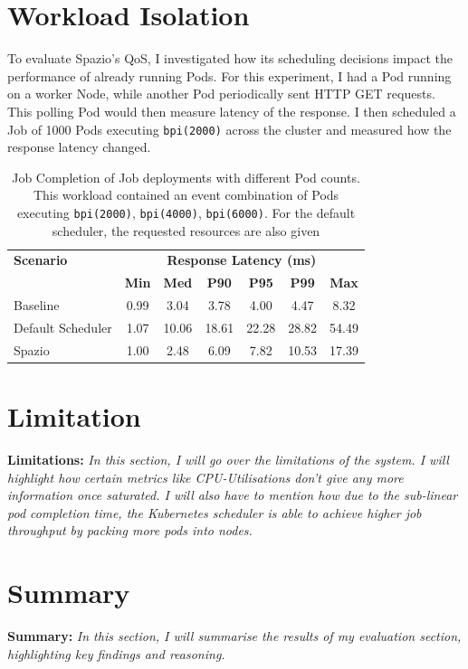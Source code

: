 \section{Workload Isolation}
To evaluate Spazio's QoS, I investigated how its scheduling decisions impact the
performance of already running Pods. For this experiment, I had a Pod running on
a worker Node, while another Pod periodically sent HTTP GET requests. This
polling Pod would then measure latency of the response. I then scheduled a Job
of 1000 Pods executing \texttt{bpi(2000)} across the cluster and measured how
the response latency changed.

\begin{table}[h!]
\centering
    \begin{tabular}{|l|c|c|c|c|c|c|}
    \hline
    \textbf{Scenario} & \multicolumn{6}{c|}{\textbf{Response Latency (ms)}} \\
    \cline{2-7}
    & \textbf{Min} & \textbf{Med} & \textbf{P90} & \textbf{P95} & \textbf{P99} & \textbf{Max} \\
    \hline
    Baseline & 0.99 & 3.04 & 3.78 & 4.00 & 4.47 & 8.32 \\
    Default Scheduler & 1.07 & 10.06 & 18.61 & 22.28 & 28.82 & 54.49\\
    Spazio  & 1.00 & 2.48 & 6.09 & 7.82 & 10.53 & 17.39\\
    \hline
    \end{tabular}
    \caption{Job Completion of Job deployments with different Pod counts. This
    workload contained an event combination of Pods executing
    \texttt{bpi(2000)}, \texttt{bpi(4000)}, \texttt{bpi(6000)}. For the default
    scheduler, the requested resources are also given}
    \label{tab:pi-mixed-throughput}
\end{table}

\section{Limitation}
\begin{tcolorbox}[boxsep=0mm,left=2.5mm,right=2.5mm]
    \textbf{Limitations:} {\em In this section, I will go over the limitations
    of the system. I will highlight how certain metrics like CPU-Utilisations
    don't give any more information once saturated. I will also have to mention
    how due to the sub-linear pod completion time, the Kubernetes scheduler is
    able to achieve higher job throughput by packing more pods into nodes.
    }
\end{tcolorbox}

\section{Summary}
\begin{tcolorbox}[boxsep=0mm,left=2.5mm,right=2.5mm]
    \textbf{Summary:} {\em In this section, I will summarise the results of my
    evaluation section, highlighting key findings and reasoning.
    }
\end{tcolorbox}

